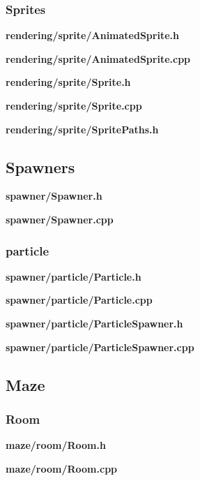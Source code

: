 \documentclass[../Main.tex]{subfiles}
\begin{document}
        \subsubsection{Sprites}
            \textbf{rendering/sprite/AnimatedSprite.h}
            
            \textbf{rendering/sprite/AnimatedSprite.cpp}
            

            \textbf{rendering/sprite/Sprite.h}
            
            \textbf{rendering/sprite/Sprite.cpp}
            

            \textbf{rendering/sprite/SpritePaths.h}
            

    \subsection{Spawners}
        \textbf{spawner/Spawner.h}
        
        \textbf{spawner/Spawner.cpp}
        

        \subsubsection{particle}
            \textbf{spawner/particle/Particle.h}
            
            \textbf{spawner/particle/Particle.cpp}
            

            \textbf{spawner/particle/ParticleSpawner.h}
            
            \textbf{spawner/particle/ParticleSpawner.cpp}
            

    \subsection{Maze}
        \subsubsection{Room}
            \textbf{maze/room/Room.h}
            
            \textbf{maze/room/Room.cpp}
            
\end{document}

